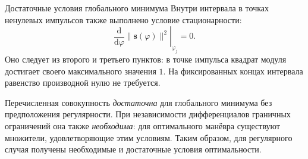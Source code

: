 \documentclass[11pt,aspectratio=169,t]{beamer}
\newcommand{\eqcompact}{\fontsize{10}{12}\selectfont}
\newcommand{\derivationmathspacing}{%
  \setlength{\abovedisplayskip}{2pt}%
  \setlength{\belowdisplayskip}{3pt}%
  \setlength{\abovedisplayshortskip}{2pt}%
  \setlength{\belowdisplayshortskip}{2pt}%
  \setlength{\jot}{2pt}}
\begin{document}
\begin{frame}{Достаточные условия глобального минимума}
\relax
\derivationmathspacing
\justifying
Внутри интервала в точках ненулевых импульсов также выполнено
условие стационарности:
{\eqcompact\derivationmathspacing
\[
\left.\frac{\mathrm d}{\mathrm d\varphi}\|\boldsymbol s(\varphi)\|^2
          \right|_{\varphi_j}=0.
\]
}
Оно следует из второго и третьего пунктов: в точке импульса
квадрат модуля достигает своего максимального значения $1$.
На фиксированных концах интервала равенство производной нулю
не требуется.

Перечисленная совокупность \emph{достаточна} для глобального
минимума без предположения регулярности. При независимости дифференциалов граничных ограничений
она также \emph{необходима}: для оптимального
манёвра существуют множители, удовлетворяющие этим условиям.
Таким образом, для регулярного случая получены необходимые
и достаточные условия оптимальности.
\end{frame}
\end{document}
